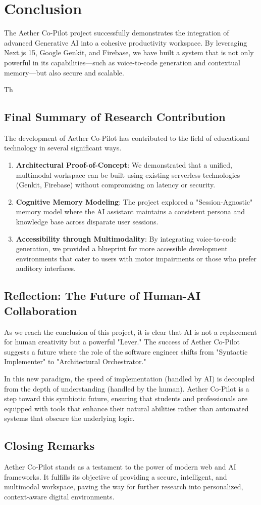 \chapter{Conclusion}

The Aether Co-Pilot project successfully demonstrates the integration of advanced Generative AI into a cohesive productivity workspace. By leveraging Next.js 15, Google Genkit, and Firebase, we have built a system that is not only powerful in its capabilities—such as voice-to-code generation and contextual memory—but also secure and scalable.

Th\section{Final Summary of Research Contribution}
The development of Aether Co-Pilot has contributed to the field of educational technology in several significant ways.
\begin{enumerate}
    \item \textbf{Architectural Proof-of-Concept}: We demonstrated that a unified, multimodal workspace can be built using existing serverless technologies (Genkit, Firebase) without compromising on latency or security.
    \item \textbf{Cognitive Memory Modeling}: The project explored a "Session-Agnostic" memory model where the AI assistant maintains a consistent persona and knowledge base across disparate user sessions.
    \item \textbf{Accessibility through Multimodality}: By integrating voice-to-code generation, we provided a blueprint for more accessible development environments that cater to users with motor impairments or those who prefer auditory interfaces.
\end{enumerate}

\section{Reflection: The Future of Human-AI Collaboration}
As we reach the conclusion of this project, it is clear that AI is not a replacement for human creativity but a powerful "Lever." The success of Aether Co-Pilot suggests a future where the role of the software engineer shifts from "Syntactic Implementer" to "Architectural Orchestrator."

In this new paradigm, the speed of implementation (handled by AI) is decoupled from the depth of understanding (handled by the human). Aether Co-Pilot is a step toward this symbiotic future, ensuring that students and professionals are equipped with tools that enhance their natural abilities rather than automated systems that obscure the underlying logic.

\section{Closing Remarks}
Aether Co-Pilot stands as a testament to the power of modern web and AI frameworks. It fulfills its objective of providing a secure, intelligent, and multimodal workspace, paving the way for further research into personalized, context-aware digital environments.

\newpage
